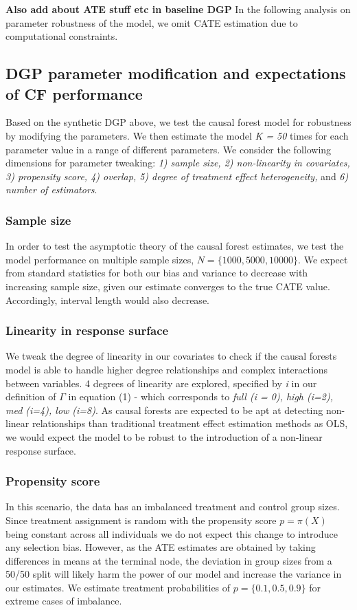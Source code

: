\documentclass[12pt]{article}
\begin{document}
\textbf{Also add about ATE stuff etc in baseline DGP} In the following analysis on parameter robustness of the model, we omit CATE estimation due to computational constraints. 

\subsection{DGP parameter modification and expectations of CF performance}

Based on the synthetic DGP above, we test the causal forest model for robustness by modifying the parameters. We then estimate the model \textit{K = 50} times for each parameter value in a range of different parameters. We consider the following dimensions for parameter tweaking: \textit{1) sample size, 2) non-linearity in covariates, 3) propensity score, 4) overlap, 5) degree of treatment effect heterogeneity,} and \textit{6) number of estimators}. 
\subsubsection{Sample size} 
In order to test the asymptotic theory of the causal forest estimates, we test the model performance on multiple sample sizes, $ N = \{1000, 5000, 10000\}$. We expect from standard statistics for both our bias and variance to decrease with increasing sample size, given our estimate converges to the true CATE value. Accordingly, interval length would also decrease.

\subsubsection{Linearity in response surface} 
We tweak the degree of linearity in our covariates to check if the causal forests model is able to handle higher degree relationships and complex interactions between variables. 4 degrees of linearity are explored, specified by \textit{i} in our definition of $\Gamma$ in equation (1) - which corresponds to \textit{full (i = 0), high (i=2), med (i=4), low (i=8)}. As causal forests are expected to be apt at detecting non-linear relationships than traditional treatment effect estimation methods as OLS, we would expect the model to be robust to the introduction of a non-linear response surface. 

\subsubsection{Propensity score} 
In this scenario, the data has an imbalanced treatment and control group sizes. Since treatment assignment is random with the propensity score $p = \pi(X)$ being constant across all individuals we do not expect this change to introduce any selection bias. However, as the ATE estimates are obtained by taking differences in means at the terminal node, the deviation in group sizes from a 50/50 split will likely harm the power of our model and increase the variance in our estimates. We estimate treatment probabilities of $p = \{0.1, 0.5, 0.9\}$ for extreme cases of imbalance. 
\end{document}
